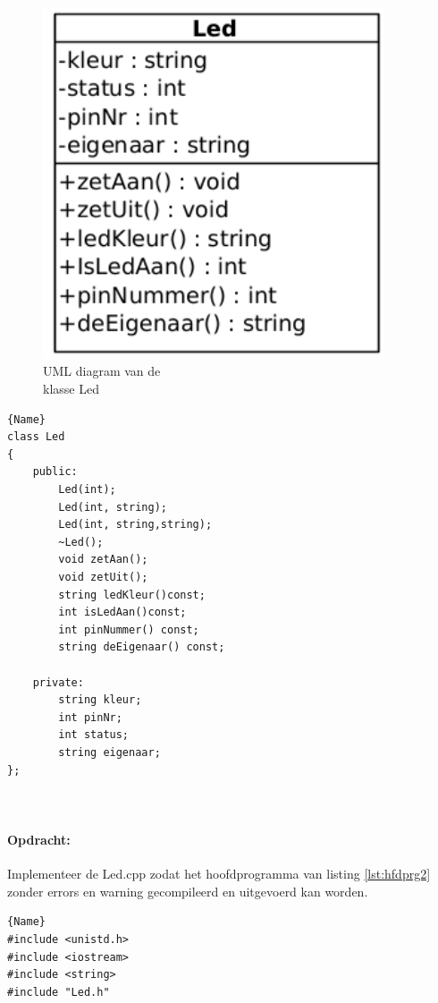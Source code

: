 \begin{enumerate}
\begin{itemize}
	\begin{minipage}{0.5\textwidth} 
	\begin{figure}[H]
		\includegraphics[width=0.9\textwidth]{figuren/klasseLedOpg1}
		\caption{UML diagram van de \\klasse Led}
		\label{fig:klassLed}   
	\end{figure}
\end{minipage}\hfill
\begin{minipage}{.45\textwidth}
	
	\begin{lstlisting}[caption=LED declaratie file(.h),frame=tlrb,label={lst:ledH}]{Name}
class Led
{
	public:
    	Led(int);
		Led(int, string);
		Led(int, string,string);
		~Led();
		void zetAan();
		void zetUit();
		string ledKleur()const;
		int isLedAan()const;
		int pinNummer() const;
		string deEigenaar() const;
			
	private:
		string kleur;
		int pinNr;
		int status;  
		string eigenaar;
};
		
		
	\end{lstlisting}
	
\end{minipage}
\paragraph{Opdracht:} Implementeer de Led.cpp zodat het hoofdprogramma van listing \ref{lst:hfdprg2} zonder errors en warning gecompileerd en uitgevoerd kan worden. 
\begin{lstlisting}[caption=Hoofdprogramma om de LED uit te testen ,frame=tlrb, label={lst:hfdprg2}]{Name}
#include <unistd.h>
#include <iostream>
#include <string>
#include "Led.h"


\end{lstlisting}
\end{itemize}
\end{enumerate}
